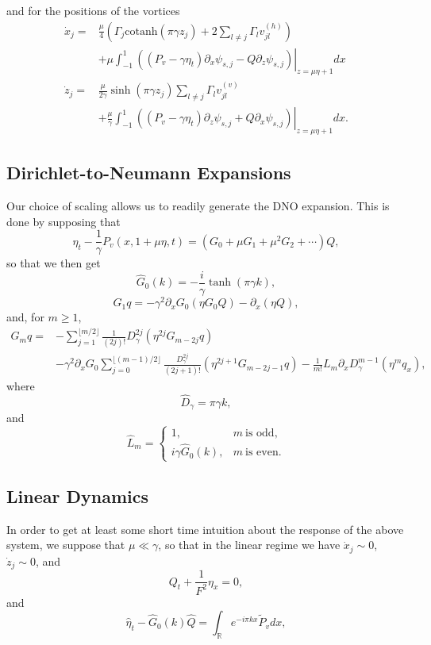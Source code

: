 \documentclass[a4paper,11pt]{article}
\newcommand{\ba}{\begin{array}}
\newcommand{\ea}{\end{array}}
\newcommand{\p}{\partial}
\begin{document}
and for the positions of the vortices
\begin{align*}
\dot{x}_{j} = &\frac{\mu }{4}\left(\Gamma_{j}\mbox{cotanh}\left(\pi \gamma z_{j} \right)+2\sum_{l\neq j}\Gamma_{l}v_{jl}^{(h)} \right)\\
&  +\mu\int_{-1}^{1}\left.\left( \left(P_{v} - \gamma \eta_{t}\right)\p_{x}\psi_{s,j} -  Q \p_{z}\psi_{s,j} \right)\right|_{z=\mu\eta + 1} dx\\
\dot{z}_{j} = & \frac{\mu}{2\gamma}\sinh\left( \pi \gamma z_{j}\right)\sum_{l\neq j} \Gamma_{l} v_{jl}^{(v)}\\
&  +  \frac{\mu}{\gamma }\int_{-1}^{1}\left.\left( \left(P_{v} - \gamma \eta_{t}\right)\p_{z}\psi_{s,j} + Q \p_{x}\psi_{s,j} \right)\right|_{z= \mu \eta + 1} dx.
\end{align*}
\subsection*{Dirichlet-to-Neumann Expansions}
Our choice of scaling allows us to readily generate the DNO expansion.  This is done by supposing that 
\[
\eta_{t} - \frac{1}{\gamma}P_{v}(x,1+\mu \eta,t) = \left(G_{0} + \mu G_{1} + \mu^{2}  G_{2} + \cdots \right)Q, 
\]
so that we then get 
\[
\hat{G}_{0}(k) = -\frac{i}{\gamma}\tanh(\pi \gamma k),
\]
\[
G_{1}q = -\gamma^{2}\p_{x}G_{0}(\eta G_{0}Q) - \p_{x}(\eta Q),
\]
and, for $m\geq 1$, 
\begin{align*}
G_{m}q = & -\sum_{j=1}^{\lfloor{m/2}\rfloor}\frac{1}{(2j)!}D^{2j}_{\gamma}\left(\eta^{2j}G_{m-2j}q\right) \\
& - \gamma^{2}\p_{x}G_{0} \sum_{j=0}^{\lfloor{(m-1)/2}\rfloor}\frac{D_{\gamma}^{2j}}{(2j+1)!}\left(\eta^{2j+1}G_{m-2j-1}q\right) - \frac{1}{m!}L_{m} \p_{x}D_{\gamma}^{m-1}\left(\eta^{m}q_{x} \right),
\end{align*}
where
\[
\hat{D}_{\gamma} = \pi \gamma k,
\]
and
\[
\hat{L}_{m} = \left\{
\ba{rl}
1,  & m~\mbox{is odd}, \\
i\gamma \hat{G}_{0}(k),  & m~\mbox{is even}.
\ea
\right.
\]
\subsection*{Linear Dynamics}
In order to get at least some short time intuition about the response of the above system, we suppose that $\mu \ll \gamma$, so that in the linear regime we have $\dot{x}_{j}\sim 0$, $\dot{z}_{j}\sim 0$, and 
\[
Q_{t} + \frac{1}{F^{2}}\eta_{x} = 0,
\]
and
\[
\hat{\eta}_{t} -\hat{G}_{0}(k)\hat{Q} = \int_{\mathbb{R}}e^{-i \pi kx} \tilde{P}_{v}dx,
\]
\end{document}
